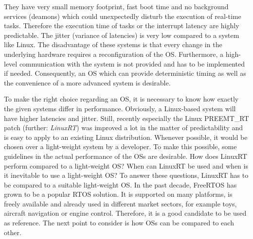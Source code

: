 They have very small memory footprint, fast boot time and no background services (deamons) which could unexpectedly disturb the execution of real-time tasks. 
Therefore the execution time of tasks or the interrupt latency are highly predictable.
The jitter (variance of latencies) is very low compared to a system like Linux. 
The disadvantage of these systems is that every change in the underlying hardware requires a reconfiguration of the \ac{OS}.
Furthermore, a high-level communication with the system is not provided and has to be implemented if needed.  
Consequently, an \ac{OS} which can provide deterministic timing as well as the convenience of a more advanced system is desirable.  
\par
To make the right choice regarding an \ac{OS}, it is necessary to know how exactly the given systems differ in performance. 
Obviously, a Linux-based system will have higher latencies and jitter. 
Still, recently especially the Linux PREEMT\_RT patch (further: \textit{LinuxRT}) was improved a lot in the matter of predictability and is easy to apply to an existing Linux distribution. 
Whenever possible, it would be chosen over a light-weight system by a developer. 
To make this possible, some guidelines in the actual performance of the \acp{OS} are desirable. 
How does LinuxRT perform compared to a light-weight \ac{OS}?
When can LinuxRT be used and when is it inevitable to use a light-weight \ac{OS}?
To answer these questions, LinuxRT has to be compared to a suitable light-weight \ac{OS}. 
In the past decade, FreeRTOS has grown to be a popular \ac{RTOS} solution.
It is supported on many platforms, is freely available and already used in different market sectors, for example toys, aircraft navigation or engine control. 
Therefore, it is a good candidate to be used as reference.  
The next point to consider is how \acp{OS} can be compared to each other.
 
